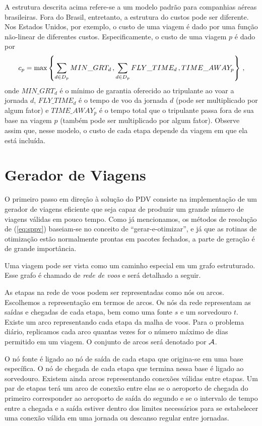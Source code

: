 A estrutura descrita acima refere-se a um modelo padrão para companhias aéreas brasileiras.
Fora do Brasil, entretanto, a estrutura do custos pode ser diferente. Nos Estados Unidos, por 
exemplo, o custo de uma viagem é dado por uma função não-linear de diferentes custos. 
Especificamente, o custo de uma viagem $p$ é dado por
%
\begin{equation*}
	c_p = \max\left\{\sum_{d \in D_p} MIN\_GRT_d \, , \sum_{d \in D_p} FLY\_TIME_d \, , 
	TIME\_AWAY_p \right\} \, ,
\end{equation*}
%
onde $MIN\_GRT_d$ é o mínimo de garantia oferecido ao tripulante ao voar a jornada $d$, 
$FLY\_TIME_d$ é o tempo de voo da jornada $d$ (pode ser multiplicado por algum fator) e
$TIME\_AWAY_p$ é o tempo total que o tripulante passa fora de sua base na viagem $p$ (também pode
ser multiplicado por algum fator). Observe assim que, nesse modelo, o custo de cada etapa depende da
viagem em que ela está incluída.


\section{Gerador de Viagens}
\label{sec:gerador_viagens}

O primeiro passo em direção à solução do PDV consiste na implementação de um gerador de viagens 
eficiente que seja capaz de produzir um grande número de viagens válidas em pouco tempo. Como já
mencionamos, os métodos de resolução de (\ref{eq:sppv}) baseiam-se no conceito de 
``gerar-e-otimizar'', e já que as rotinas de otimização estão normalmente prontas em pacotes 
fechados, a parte de geração é de grande importância.

Uma viagem pode ser vista como um caminho especial em um grafo estruturado. Esse grafo é chamado de
\emph{rede de voos} e será detalhado a seguir. 

As etapas na rede de voos podem ser representadas como nós ou arcos. Escolhemos a representação em
termos de arcos. Os nós da rede representam as saídas e chegadas de cada etapa, bem como uma fonte
$s$ e um sorvedouro $t$. Existe um arco representando cada etapa da malha de voos. Para o problema
diário, replicamos cada arco quantas vezes for o número máximo de dias permitido em um viagem. O
conjunto de arcos será denotado por $\mathcal{A}$.

O nó fonte é ligado ao nó de saída de cada etapa que origina-se em uma base específica. O nó de
chegada de cada etapa que termina nessa base é ligado ao sorvedouro. Existem ainda arcos
representando conexões válidas entre etapas. Um par de etapas terá um arco de conexão entre elas se
o aeroporto de chegada do primeiro corresponder ao aeroporto de saída do segundo e se o intervalo de
tempo entre a chegada e a saída estiver dentro dos limites necessários para se estabelecer uma
conexão válida em uma jornada ou descanso regular entre jornadas. 

